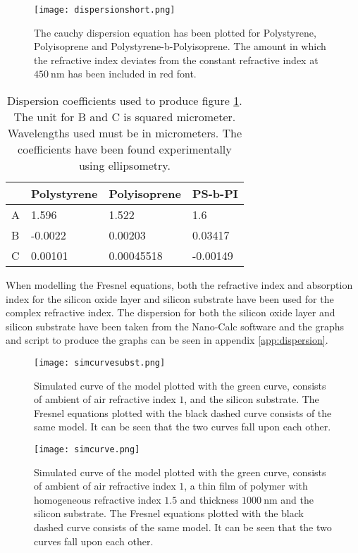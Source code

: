 \documentclass[MasterThesisMain.tex]{subfiles}
\begin{document}
\begin{figure}[H]
\centering
\texttt{[image: dispersionshort.png]}
\caption{The cauchy dispersion equation has been plotted for Polystyrene, Polyisoprene and Polystyrene-b-Polyisoprene. The amount in which the refractive index deviates from the constant refractive index at $\SI{450}{\nano\meter}$ has been included in red font.}
\label{fig:dispshort}
\end{figure} 

\begin{table}[H]
\centering
\begin{tabular}{|l|l|l|l|}
\hline
  & Polystyrene & Polyisoprene & PS-b-PI  \\ \hline
A & 1.596       & 1.522        & 1.6      \\ \hline
B & -0.0022     & 0.00203      & 0.03417  \\ \hline
C & 0.00101     & 0.00045518   & -0.00149 \\ \hline
\end{tabular}
\caption{Dispersion coefficients used to produce figure \ref{fig:dispshort}. The unit for B and C is squared micrometer. Wavelengths used must be in micrometers. The coefficients have been found experimentally using ellipsometry.}
\end{table}

When modelling the Fresnel equations, both the refractive index and absorption index for the silicon oxide layer and silicon substrate have been used for the complex refractive index. The dispersion for both the silicon oxide layer and silicon substrate have been taken from the Nano-Calc software and the graphs and script to produce the graphs can be seen in appendix \ref{app:dispersion}.  

\begin{figure}[H]
\centering
\texttt{[image: simcurvesubst.png]}
\caption{Simulated curve of the model plotted with the green curve, consists of ambient of air refractive index $1$, and the silicon substrate. The Fresnel equations plotted with the black dashed curve consists of the same model. It can be seen that the two curves fall upon each other.}
\label{fig:simmodelsubst}
\end{figure}

\begin{figure}[H]
\centering
\texttt{[image: simcurve.png]}
\caption{Simulated curve of the model plotted with the green curve, consists of ambient of air refractive index $1$, a thin film of polymer with homogeneous refractive index $1.5$ and thickness $\SI{1000}{\nano\meter}$ and the silicon substrate. The Fresnel equations plotted with the black dashed curve consists of the same model. It can be seen that the two curves fall upon each other.}
\label{fig:simmodel1}
\end{figure}
\end{document}
